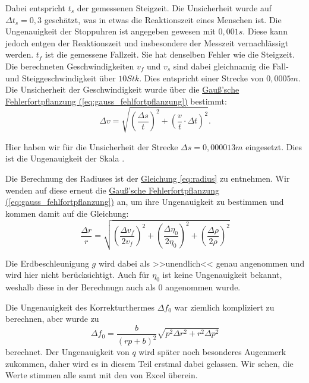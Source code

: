 Dabei entspricht $t_s$ der gemessenen Steigzeit. Die Unsicherheit wurde auf $\Delta t_s = 0,3$ geschätzt, was in etwas die Reaktionszeit eines Menschen ist.
Die Ungenauigkeit der Stoppuhren ist angegeben gewesen mit $0,001s$. Diese kann jedoch entgen der Reaktionszeit und insbesondere der Messzeit vernachlässigt werden.
$t_f$ ist die gemessene Fallzeit. Sie hat denselben Fehler wie die Steigzeit. Die berechneten Geschwindigkeiten $v_f$ und $v_s$ sind dabei gleichnamig die Fall- und Steiggeschwindigkeit über $10Stk$. 
Dies entspricht einer Strecke von $0,0005m$. Die Unsicherheit der Geschwindigkeit wurde über die \hyperref[eq:gauss_fehlfortpflanzung]{Gauß'sche Fehlerfortpflanzung (\ref*{eq:gauss_fehlfortpflanzung})} bestimmt:
\begin{equation}
    \Delta v = \sqrt{\left(\frac{\Delta s}{t}\right)^2 + \left(\frac{v}{t} \cdot \Delta t\right)^2}.
\end{equation}

Hier haben wir für die Unsicherheit der Strecke $\Delta s = 0,000013m$ eingesetzt. Dies ist die Ungenauigkeit der Skala \cite{skript25}.

Die Berechnung des Radiuses ist der \hyperref[eq:radius]{Gleichung \ref*{eq:radius}} zu entnehmen. Wir wenden auf diese erneut die \hyperref[eq:gauss_fehlfortpflanzung]{Gauß'sche Fehlerfortpflanzung (\ref*{eq:gauss_fehlfortpflanzung})} an, um ihre Ungenauigkeit zu bestimmen und kommen damit auf die Gleichung:
\begin{equation}
    \frac{\Delta r}{r} = \sqrt{\left(\frac{\Delta v_f}{2v_f}\right)^2 + \left(\frac{\Delta \eta_0}{2 \eta_0}\right)^2 + \left(\frac{\Delta \rho}{2 \rho}\right)^2}
\end{equation}

Die Erdbeschleunigung $g$ wird dabei als >>unendlich<< genau angenommen und wird hier nicht berücksichtigt. Auch für $\eta_0$ ist keine Ungenauigkeit bekannt, weshalb diese in der Berechnugn auch als $0$ angenommen wurde. 

Die Ungenauigkeit des Korrekturthermes $\Delta f_0$ war ziemlich kompliziert zu berechnen, aber wurde zu
\begin{equation}
 \Delta f_0 = \frac{b}{(r p + b)^2} \sqrt{p^2 \Delta r^2 + r^2 \Delta p^2}
\end{equation}
berechnet. Der Ungenauigkeit von $q$ wird später noch besonderes Augenmerk zukommen, daher wird es in diesem Teil erstmal dabei gelassen.
Wir sehen, die Werte stimmen alle samt mit den von Excel überein.

\newpage

